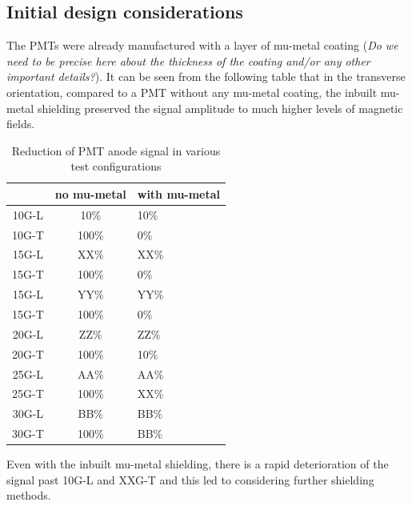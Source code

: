 \documentclass[12pt]{article}
\begin{document}
\subsection{Initial design considerations}
The PMTs were already manufactured with a layer of mu-metal coating (\textit{Do we need to be precise here about the thickness of the coating and/or any other important details?}). It can be seen from the following table that in the transverse orientation, compared to a PMT without any mu-metal coating, the inbuilt mu-metal shielding preserved the signal amplitude to much higher levels of magnetic fields.


\begin{table}[H]
	\begin{center}
		\begin{tabular}{|c|c|l|}
			\hline
	 		& no mu-metal & with mu-metal \\
			\hline
 			10G-L & 10\% & 10\% \\
 			10G-T & 100\% & 0\% \\ 
 			\hline
 			15G-L & XX\% & XX\% \\
 			15G-T & 100\% & 0\% \\
 			\hline
 			15G-L & YY\% & YY\% \\
 			15G-T & 100\% & 0\% \\
 			\hline
 			20G-L & ZZ\% & ZZ\% \\
 			20G-T & 100\% & 10\% \\
 			\hline
 			25G-L & AA\% & AA\% \\
 			25G-T & 100\% & XX\% \\
 			\hline
 			30G-L & BB\% & BB\% \\
 			30G-T & 100\% & BB\% \\
 			\hline
		\end{tabular}
	\end{center}
	\caption{Reduction of PMT anode signal in various test configurations}
\end{table}


Even with the inbuilt mu-metal shielding, there is a rapid deterioration of the signal past 10G-L and XXG-T and this led to considering further shielding methods.
\end{document}
